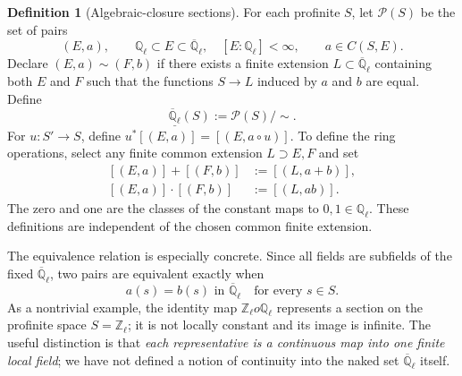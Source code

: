 \documentclass[11pt,a4paper]{article}
\numberwithin{equation}{section}
\theoremstyle{definition}
\newtheorem{definition}[theorem]{Definition}
\theoremstyle{remark}
\newcommand{\ringunder}[1]{\underline{#1}}
\newcommand{\Qlbar}{\overline{\mathbb Q}_{\ell}}
\begin{document}
\begin{definition}[Algebraic-closure sections]\label{def:Qbar}
For each profinite $S$, let $\mathscr P(S)$ be the set of pairs
\[
 (E,a),\qquad
 \mathbb Q_\ell\subset E\subset\Qlbar,\quad [E:\mathbb Q_\ell]<\infty,
 \qquad a\in C(S,E).
\]
Declare $(E,a)\sim(F,b)$ if there exists a finite extension
$L\subset\Qlbar$ containing both $E$ and $F$ such that the functions
$S\to L$ induced by $a$ and $b$ are equal.  Define
\begin{equation}\label{eq:Qbar-def}
 \boxed{\quad
  \ringunder{\Qlbar}(S):=\mathscr P(S)/{\sim}.
 \quad}
\end{equation}
For $u:S'\to S$, define $u^*[(E,a)]=[(E,a\circ u)]$.
To define the ring operations, select any finite common extension
$L\supset E,F$ and set
\begin{align}\label{eq:Qbar-arithmetic}
 [(E,a)]+[(F,b)]&:=[(L,a+b)],\\
 [(E,a)]\cdot[(F,b)]&:=[(L,ab)].
\end{align}
The zero and one are the classes of the constant maps to
$0,1\in\mathbb Q_\ell$.  These definitions are independent of the
chosen common finite extension.
\end{definition}

The equivalence relation is especially concrete.  Since all fields
are subfields of the fixed $\Qlbar$, two pairs are equivalent exactly
when
\[
                      a(s)=b(s)\text{ in }\Qlbar
                    \quad\text{for every }s\in S.
\]
As a nontrivial example, the identity map
$\mathbb Z_\ell	o\mathbb Q_\ell$ represents a section on the
profinite space $S=\mathbb Z_\ell$; it is not locally constant and its
image is infinite.
The useful distinction is that \emph{each representative is a continuous
map into one finite local field}; we have not defined a notion of
continuity into the naked set $\Qlbar$ itself.
\end{document}
